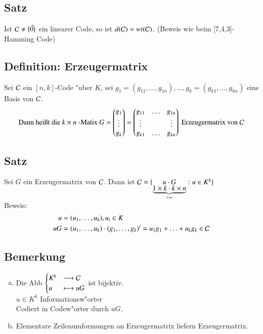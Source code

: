 \subsection{Satz}
Ist $\mathcal{C} \neq \lbrace \vec{0} \rbrace$ ein linearer Code, so ist $d(\mathcal{C})=wt(\mathcal{C})$. (Beweis wie beim [7,4,3]-Hamming Code)

\subsection{Definition: Erzeugermatrix} %
Sei $\mathcal{C}$ ein $[n,k]$-Code "uber $K$, sei $g_1=(g_{11},\ldots,g_{1n}),\ldots,g_k=(g_{k1},\ldots,g_{kn})$ eine Basis von $\mathcal{C}$.
\[
	\text{Dann hei\ss t die } k\times n\text{ -Matix } G=
	\begin{pmatrix}
		g_1 \\ \vdots \\ g_k \\
	\end{pmatrix}
	=
	\begin{pmatrix}
		g_{11}&\ldots&g_{1n}\\
		\vdots&&\vdots\\
		g_{k1}&\ldots&g_{kn}
	\end{pmatrix}
	\text{ Erzeugermatrix von } \mathcal{C}
\]
\subsection{Satz}
Sei $G$ ein Erzeugermatrix von $\mathcal{C}$. Dann ist $\mathcal{C} = \lbrace \underset{\underset{1 \times n}{\underbrace{1\times k \cdot k\times n}}}{u \cdot G}: u \in K^k \rbrace$\\
Beweis:
\begin{align*}
	u&=(u_1,\ldots,u_k),u_i\in K\\
	uG&=(u_1,\ldots,u_k) \cdot (g_1,\ldots,g_k)^t=u_1g_1+\ldots + u_kg_k \in \mathcal{C}
\end{align*}
\subsection{Bemerkung}
\begin{enumerate}[a)]
	\item Die Abb 
	$\begin{cases}
		K^k & \longrightarrow \mathcal{C}\\
		u & \longmapsto uG
	\end{cases}$ ist bijektiv. \\
	$u \in K^k$ Informationsw"orter \\
	Codiert in Codew"orter durch $uG$.
	\item Elementare Zeilenumformungen an Erzeugermatrix liefern Erzeugermatrix.
\end{enumerate}

